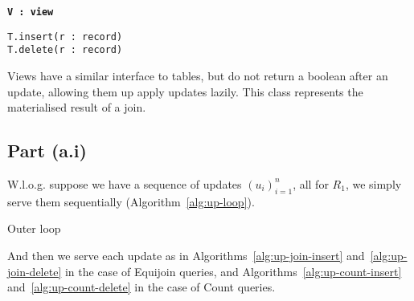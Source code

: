 \begin{marginfigure}
  \textbf{\texttt{V\,:\,view}}
  \begin{description}
    \item[\texttt{T.insert(r\,:\,record)}]
    \item[\texttt{T.delete(r\,:\,record)}]
  \end{description}
  \caption{Views have a similar interface to tables, but do not return a boolean after an update, allowing them up apply updates lazily. This class represents the materialised result of a join.}\label{iface:view}
\end{marginfigure}

\subsection{Part (a.i)}\label{sec:q-1-a-i}

W.l.o.g. suppose we have a sequence of updates $(u_i)_{i=1}^n$, all for $R_1$, we simply serve them sequentially (Algorithm~\ref{alg:up-loop}).

\begin{algorithm}
  \caption{Outer loop}\label{alg:up-loop}
\end{algorithm}

And then we serve each update as in Algorithms~\ref{alg:up-join-insert} and~\ref{alg:up-join-delete} in the case of Equijoin queries, and Algorithms~\ref{alg:up-count-insert} and~\ref{alg:up-count-delete} in the case of Count queries.

